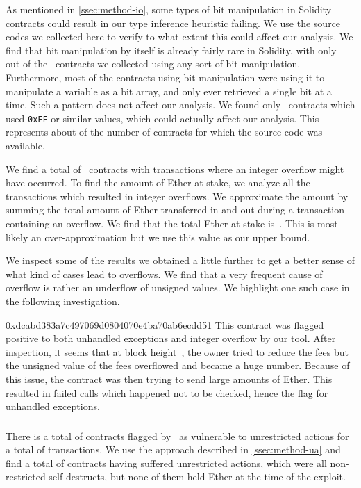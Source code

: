 As mentioned in \autoref{ssec:method-io}, some types of bit manipulation in Solidity contracts could result in our type inference heuristic failing. We use the source codes we collected here to verify to what extent this could affect our analysis. We find that bit manipulation by itself is already fairly rare in Solidity, with only~ out of the~ contracts we collected using any sort of bit manipulation. Furthermore, most of the contracts using bit manipulation were using it to manipulate a variable as a bit array, and only ever retrieved a single bit at a time. Such a pattern does not affect our analysis. We found only~ contracts which used \lstinline{0xFF} or similar values, which could actually affect our analysis. This represents about  of the number of contracts for which the source code was available.

We find a total of~ contracts with transactions where an integer overflow might have occurred.
To find the amount of Ether at stake, we analyze all the transactions which resulted in integer overflows. We approximate the amount by summing the total amount of Ether transferred in and out during a transaction containing an overflow. We find that the total Ether at stake is~. This is most likely an over-approximation but we use this value as our upper bound.

We inspect some of the results we obtained a little further to get a better sense of what kind of cases lead to overflows.
We find that a very frequent cause of overflow is rather an underflow of unsigned values.
We highlight one such case in the following investigation.

\begin{investigation}{0xdcabd383a7c497069d0804070e4ba70ab6ecdd51}
	This contract was flagged positive to both unhandled exceptions and integer overflow by our tool.
	After inspection, it seems that at block height~, the owner tried to reduce the fees but the unsigned value of the fees overflowed and became a huge number. Because of this issue, the contract was then trying to send large amounts of Ether.
	This resulted in failed calls which happened not to be checked, hence the flag for unhandled exceptions.
\end{investigation}

\subsubsection{\unrestrictedaction}
\label{ssec:analysis-ua}
There is a total of  contracts flagged by~\cite{Tsankov2018,Nikolic2018a,Krupp2018} as vulnerable to unrestricted actions for a total of  transactions. We use the approach described in \autoref{ssec:method-ua} and find a total of  contracts having suffered unrestricted actions, which were all non-restricted self-destructs, but none of them held Ether at the time of the exploit.

